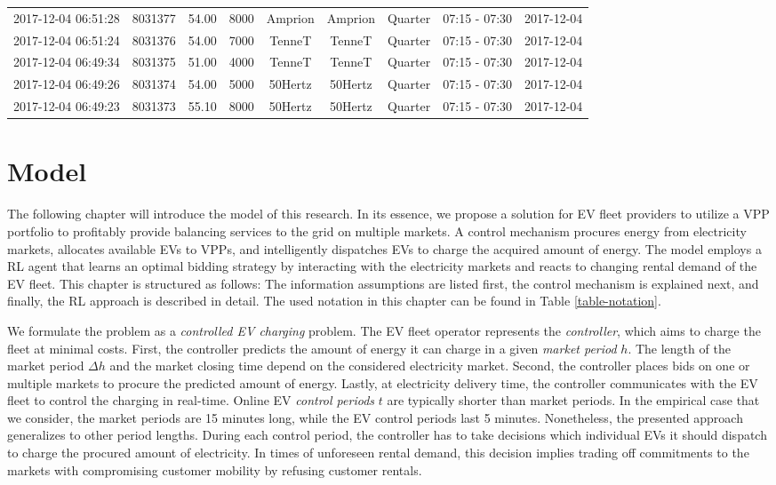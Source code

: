 \documentclass[a4paper, 12pt]{article}
\begin{document}
{\begin{table}
\begin{tabular}{c|cccccccc}
2017-12-04 06:51:28 & 8031377 & 54.00 & 8000 & Amprion & Amprion & Quarter & 07:15 - 07:30 & 2017-12-04\\
2017-12-04 06:51:24 & 8031376 & 54.00 & 7000 & TenneT & TenneT & Quarter & 07:15 - 07:30 & 2017-12-04\\
2017-12-04 06:49:34 & 8031375 & 51.00 & 4000 & TenneT & TenneT & Quarter & 07:15 - 07:30 & 2017-12-04\\
2017-12-04 06:49:26 & 8031374 & 54.00 & 5000 & 50Hertz & 50Hertz & Quarter & 07:15 - 07:30 & 2017-12-04\\
2017-12-04 06:49:23 & 8031373 & 55.10 & 8000 & 50Hertz & 50Hertz & Quarter & 07:15 - 07:30 & 2017-12-04\\
\hline
\hline
\end{tabular}
\end{table}
}

\clearpage

\section{Model}
\label{sec:org82c3242}
The following chapter will introduce the model of this research. In its essence,
we propose a solution for EV fleet providers to utilize a VPP portfolio to
profitably provide balancing services to the grid on multiple markets. A control
mechanism procures energy from electricity markets, allocates available EVs to
VPPs, and intelligently dispatches EVs to charge the acquired amount of energy.
The model employs a RL agent that learns an optimal bidding strategy by
interacting with the electricity markets and reacts to changing rental demand of
the EV fleet. This chapter is structured as follows: The information assumptions
are listed first, the control mechanism is explained next, and finally, the RL
approach is described in detail. The used notation in this chapter can be found
in Table \ref{table-notation}.

We formulate the problem as a \emph{controlled EV charging} problem. The EV fleet
operator represents the \emph{controller}, which aims to charge the fleet at minimal
costs. First, the controller predicts the amount of energy it can charge in a
given \emph{market period} \(h\). The length of the market period \(\Delta h\) and the
market closing time depend on the considered electricity market. Second, the
controller places bids on one or multiple markets to procure the predicted
amount of energy. Lastly, at electricity delivery time, the controller
communicates with the EV fleet to control the charging in real-time. Online EV
\emph{control periods} \(t\) are typically shorter than market periods. In the
empirical case that we consider, the market periods are 15 minutes long, while
the EV control periods last 5 minutes. Nonetheless, the presented approach
generalizes to other period lengths. During each control period, the controller
has to take decisions which individual EVs it should dispatch to charge the
procured amount of electricity. In times of unforeseen rental demand, this
decision implies trading off commitments to the markets with compromising
customer mobility by refusing customer rentals.
\end{document}
